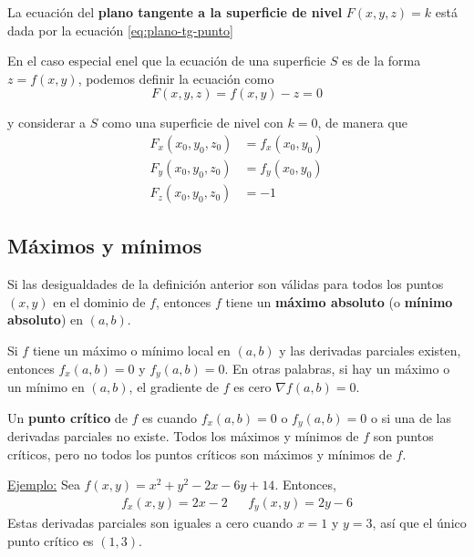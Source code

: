 \documentclass[12pt]{article}
\begin{document}
La ecuación del \textbf{plano tangente a la superficie de nivel} $ F(x,y,z) = k $ está dada por la ecuación \ref{eq:plano-tg-punto}

En el caso especial enel que la ecuación de una superficie $ S $ es de la forma $ z=f(x,y) $, podemos definir la ecuación como
\[
  F(x,y,z) = f(x,y) - z = 0
\]

y considerar a $ S $ como una superficie de nivel con $ k=0 $, de manera que
\begin{align*}
  F_{x}(x_{0},y_{0},z_{0}) &= f_{x}(x_{0},y_{0})\\
  F_{y}(x_{0},y_{0},z_{0}) &= f_{y}(x_{0},y_{0})\\
  F_{z}(x_{0},y_{0},z_{0}) &= -1
\end{align*}

\subsection{Máximos y mínimos}
\vspace{0.2cm}
\vspace{0.2cm}

Si las desigualdades de la definición anterior son válidas para todos los puntos $ (x,y) $ en el dominio de $ f $, entonces $ f $ tiene un \textbf{máximo absoluto} (o \textbf{mínimo absoluto}) en $ (a,b) $.

Si $ f $ tiene un máximo o mínimo local en $ (a,b) $ y las derivadas parciales existen, entonces $ f_{x}(a,b)=0 $ y $ f_{y}(a,b)=0 $. En otras palabras, si hay un máximo o un mínimo en $ (a,b) $, el gradiente de $ f $ es cero $ \nabla f(a,b)=0 $.

Un \textbf{punto crítico} de $ f $ es cuando $ f_{x}(a,b)=0 $ o $ f_{y}(a,b)=0 $ o si una de las derivadas parciales no existe. Todos los máximos y mínimos de $ f $ son puntos críticos, pero no todos los puntos críticos son máximos y mínimos de $ f $.

\underline{Ejemplo:} Sea $ f(x,y)=x^2 + y^2 - 2x-6y+14 $. Entonces,
\begin{align*}
	f_{x}(x,y) = 2x-2 && f_{y}(x,y)=2y-6
\end{align*}
Estas derivadas parciales son iguales a cero cuando $ x=1 $ y $ y=3 $, así que el único punto crítico es $ (1,3) $. 
\end{document}
